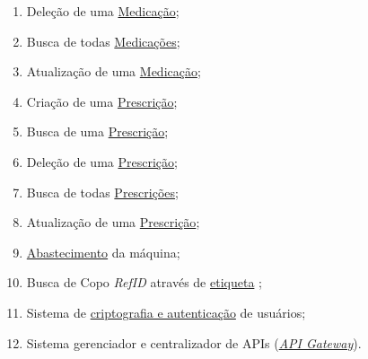 \begin{apendicesenv}
\begin{enumerate}
    \item Deleção de uma \href{https://github.com/PillWatcher/pillwatcher-dpb-patient-service/blob/master/src/main/java/br/com/pillwatcher/dpb/services/impl/MedicationServiceImpl.java#L82}{Medicação};
    \item Busca de todas \href{https://github.com/PillWatcher/pillwatcher-dpb-patient-service/blob/master/src/main/java/br/com/pillwatcher/dpb/services/impl/MedicationServiceImpl.java#L82}{Medicações};
    \item Atualização de uma \href{https://github.com/PillWatcher/pillwatcher-dpb-patient-service/blob/master/src/main/java/br/com/pillwatcher/dpb/services/impl/MedicationServiceImpl.java#L108}{Medicação};
    \item Criação de uma \href{https://github.com/PillWatcher/pillwatcher-dpb-patient-service/blob/master/src/main/java/br/com/pillwatcher/dpb/services/impl/PrescriptionServiceImpl.java#L36}{Prescrição};
    \item Busca de uma \href{https://github.com/PillWatcher/pillwatcher-dpb-patient-service/blob/master/src/main/java/br/com/pillwatcher/dpb/services/impl/PrescriptionServiceImpl.java#L82}{Prescrição};
    \item Deleção de uma \href{https://github.com/PillWatcher/pillwatcher-dpb-patient-service/blob/master/src/main/java/br/com/pillwatcher/dpb/services/impl/PrescriptionServiceImpl.java#L52}{Prescrição};
    \item Busca de todas \href{https://github.com/PillWatcher/pillwatcher-dpb-patient-service/blob/master/src/main/java/br/com/pillwatcher/dpb/services/impl/PrescriptionServiceImpl.java#L69}{Prescrições};
    \item Atualização de uma \href{https://github.com/PillWatcher/pillwatcher-dpb-patient-service/blob/master/src/main/java/br/com/pillwatcher/dpb/services/impl/MedicationServiceImpl.java#L108}{Prescrição};
    \item \href{https://github.com/PillWatcher/pillwatcher-dpb-patient-service/blob/master/src/main/java/br/com/pillwatcher/dpb/services/impl/SupplyServiceImpl.java#L27}{Abastecimento} da máquina;
    \item Busca de Copo \textit{RefID} através de \href{https://github.com/PillWatcher/pillwatcher-dpb-patient-service/blob/master/src/main/java/br/com/pillwatcher/dpb/services/impl/CupServiceImpl.java#L25}{etiqueta} ;
    \item Sistema de \href{https://github.com/PillWatcher/pillwatcher-dpb-auth-server}{criptografia e autenticação} de usuários;
    \item Sistema gerenciador e centralizador de APIs (\href{https://github.com/PillWatcher/pillwatcher-api-gateway}{\textit{API Gateway}}).
\end{enumerate}


\end{apendicesenv}
